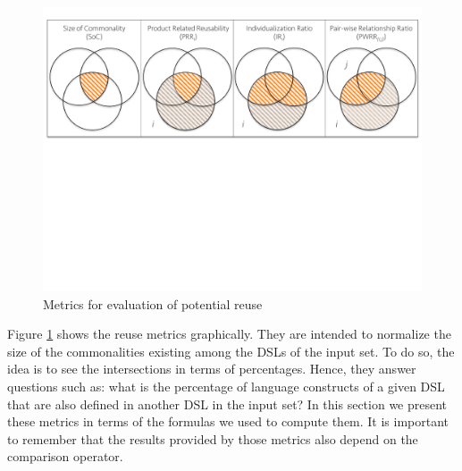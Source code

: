 \begin{figure}
\centering
\includegraphics[width=1\linewidth]{images/metrics.pdf}
\caption{Metrics for evaluation of potential reuse}
\label{fig:metrics}
\end{figure}

Figure \ref{fig:metrics} shows the reuse metrics graphically. They are intended to normalize the size of the commonalities existing among the DSLs of the input set. To do so, the idea is to see the intersections in terms of percentages. Hence, they answer questions such as: what is the percentage of language constructs of a given DSL that are also defined in another DSL in the input set? In this section we present these metrics in terms of the formulas we used to compute them. It is important to remember that the results provided by those metrics also depend on the comparison operator.

